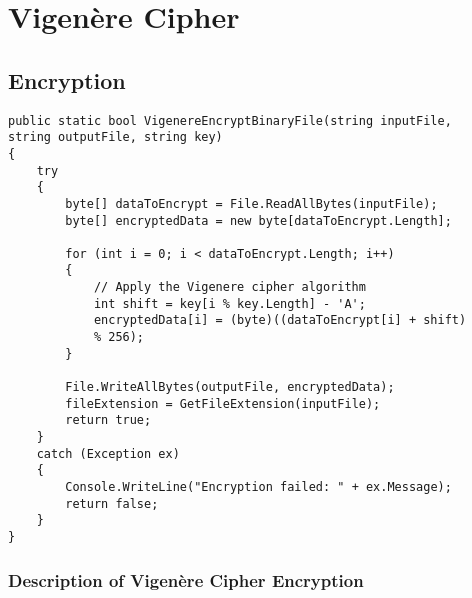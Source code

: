 \documentclass[a4paper,oneside,11pt]{book}
\begin{document}
\chapter[Vigenère Cipher]{Vigenère Cipher}
\section{Encryption}
\begin{lstlisting}[language=Csh, caption={Code for Vigenère Cipher Encryption}]
public static bool VigenereEncryptBinaryFile(string inputFile, 
string outputFile, string key)
{
    try
    {
        byte[] dataToEncrypt = File.ReadAllBytes(inputFile);
        byte[] encryptedData = new byte[dataToEncrypt.Length];

        for (int i = 0; i < dataToEncrypt.Length; i++)
        {
            // Apply the Vigenere cipher algorithm
            int shift = key[i % key.Length] - 'A'; 
            encryptedData[i] = (byte)((dataToEncrypt[i] + shift) 
            % 256);
        }

        File.WriteAllBytes(outputFile, encryptedData);
        fileExtension = GetFileExtension(inputFile);
        return true;
    }
    catch (Exception ex)
    {
        Console.WriteLine("Encryption failed: " + ex.Message);
        return false;
    }
}
\end{lstlisting}

\subsection{Description of Vigenère Cipher Encryption}
\end{document}
